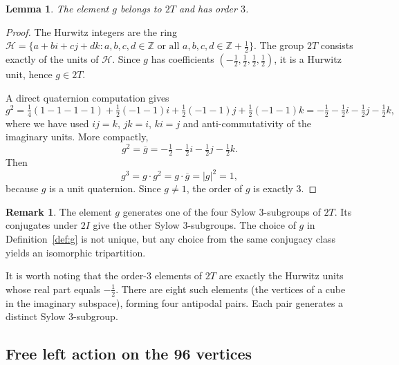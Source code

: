 \documentclass[10pt,reqno]{amsart}
\theoremstyle{plain}
\newtheorem{lemma}[theorem]{Lemma}
\theoremstyle{definition}
\newtheorem{remark}[theorem]{Remark}
\begin{document}
\begin{lemma}\label{lem:g-order}
The element $g$ belongs to $2T$ and has order $3$.
\end{lemma}

\begin{proof}
The Hurwitz integers are the ring $\mathcal{H} = \{ a + bi + cj + dk : a,b,c,d \in \mathbb{Z} \text{ or all } a,b,c,d \in \mathbb{Z} + \tfrac12 \}$. The group $2T$ consists exactly of the units of $\mathcal{H}$. Since $g$ has coefficients $(-\tfrac12, \tfrac12, \tfrac12, \tfrac12)$, it is a Hurwitz unit, hence $g \in 2T$.

A direct quaternion computation gives
\begin{equation}
g^2 = \tfrac14(1 - 1 - 1 - 1) + \tfrac12(-1 - 1)i + \tfrac12(-1 - 1)j + \tfrac12(-1 - 1)k
= -\tfrac12 - \tfrac12 i - \tfrac12 j - \tfrac12 k,
\end{equation}
where we have used $ij=k$, $jk=i$, $ki=j$ and anti-commutativity of the imaginary units. More compactly,
\begin{equation}
g^2 = \overline{g} = -\tfrac12 - \tfrac12 i - \tfrac12 j - \tfrac12 k.
\end{equation}
Then
\begin{equation}
g^3 = g \cdot g^2 = g \cdot \overline{g} = |g|^2 = 1,
\end{equation}
because $g$ is a unit quaternion. Since $g \neq 1$, the order of $g$ is exactly $3$.
\end{proof}

\begin{remark}
The element $g$ generates one of the four Sylow $3$-subgroups of $2T$. Its conjugates under $2I$ give the other Sylow $3$-subgroups. The choice of $g$ in Definition~\ref{def:g} is not unique, but any choice from the same conjugacy class yields an isomorphic tripartition.
\end{remark}

It is worth noting that the order-$3$ elements of $2T$ are exactly the Hurwitz units whose real part equals $-\tfrac12$. There are eight such elements (the vertices of a cube in the imaginary subspace), forming four antipodal pairs. Each pair generates a distinct Sylow $3$-subgroup.

\subsection{Free left action on the 96 vertices}
\end{document}
